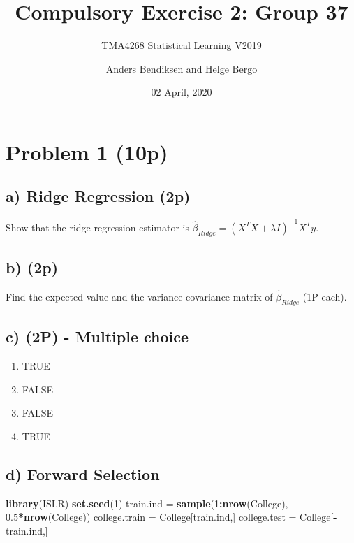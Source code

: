 \documentclass[]{article}
\title{Compulsory Exercise 2: Group 37}
\subtitle{TMA4268 Statistical Learning V2019}
\author{Anders Bendiksen and Helge Bergo}
\date{02 April, 2020}
\newenvironment{Shaded}{\begin{snugshade}}{\end{snugshade}}
\newcommand{\DecValTok}[1]{\textcolor[rgb]{0.00,0.00,0.81}{#1}}
\newcommand{\FloatTok}[1]{\textcolor[rgb]{0.00,0.00,0.81}{#1}}
\newcommand{\KeywordTok}[1]{\textcolor[rgb]{0.13,0.29,0.53}{\textbf{#1}}}
\newcommand{\NormalTok}[1]{#1}
\newcommand{\OperatorTok}[1]{\textcolor[rgb]{0.81,0.36,0.00}{\textbf{#1}}}
\newcommand{\StringTok}[1]{\textcolor[rgb]{0.31,0.60,0.02}{#1}}
\providecommand{\tightlist}{%
  \setlength{\itemsep}{0pt}\setlength{\parskip}{0pt}}
\begin{document}
\maketitle

\hypertarget{problem-1-10p}{%
\section{Problem 1 (10p)}\label{problem-1-10p}}

\hypertarget{a-ridge-regression-2p}{%
\subsection{a) Ridge Regression (2p)}\label{a-ridge-regression-2p}}

Show that the ridge regression estimator is
\(\hat\beta_{Ridge} = (X^T X + \lambda I)^{-1} X^T y\).

\hypertarget{b-2p}{%
\subsection{b) (2p)}\label{b-2p}}

Find the expected value and the variance-covariance matrix of
\(\hat\beta_{Ridge}\) (1P each).

\hypertarget{c-2p---multiple-choice}{%
\subsection{c) (2P) - Multiple choice}\label{c-2p---multiple-choice}}

\begin{enumerate}
\def\labelenumi{(\roman{enumi})}
\tightlist
\item
  TRUE
\item
  FALSE
\item
  FALSE
\item
  TRUE
\end{enumerate}

\hypertarget{d-forward-selection}{%
\subsection{d) Forward Selection}\label{d-forward-selection}}

\begin{Shaded}
\begin{Highlighting}[]
\KeywordTok{library}\NormalTok{(ISLR)}
\KeywordTok{set.seed}\NormalTok{(}\DecValTok{1}\NormalTok{)}
\NormalTok{train.ind =}\StringTok{ }\KeywordTok{sample}\NormalTok{(}\DecValTok{1}\OperatorTok{:}\KeywordTok{nrow}\NormalTok{(College), }\FloatTok{0.5}\OperatorTok{*}\KeywordTok{nrow}\NormalTok{(College))}
\NormalTok{college.train =}\StringTok{ }\NormalTok{College[train.ind,]}
\NormalTok{college.test =}\StringTok{ }\NormalTok{College[}\OperatorTok{-}\NormalTok{train.ind,]}
\end{Highlighting}
\end{Shaded}
\end{document}

